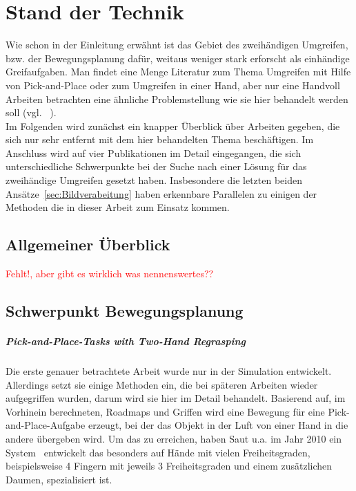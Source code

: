 \chapter{Stand der Technik}

Wie schon in der Einleitung erwähnt ist das Gebiet des zweihändigen Umgreifen, bzw. der Bewegungsplanung dafür, weitaus weniger stark erforscht als einhändige Greifaufgaben. Man findet eine Menge Literatur zum Thema Umgreifen mit Hilfe von \glqq Pick-and-Place\grqq{} oder zum Umgreifen in einer Hand, aber nur eine Handvoll Arbeiten betrachten eine ähnliche Problemstellung wie sie hier behandelt werden soll (vgl. ~\cite{Mousavi2013Taxonomy}).\\
Im Folgenden wird zunächst ein knapper Überblick über Arbeiten gegeben, die sich nur sehr entfernt mit dem hier behandelten Thema beschäftigen. Im Anschluss wird auf vier Publikationen im Detail eingegangen, die sich unterschiedliche Schwerpunkte bei der Suche nach einer Lösung für das zweihändige Umgreifen gesetzt haben. Insbesondere die letzten beiden Ansätze~\ref{sec:Bildverabeitung} haben erkennbare Parallelen zu einigen der Methoden die in dieser Arbeit zum Einsatz kommen.

\section{Allgemeiner Überblick}

\textcolor{red}{Fehlt!, aber gibt es wirklich was nennenswertes??}

\section{Schwerpunkt Bewegungsplanung}

\paragraph{Pick-and-Place-Tasks with Two-Hand Regrasping}

Die erste genauer betrachtete Arbeit wurde nur in der Simulation entwickelt. Allerdings setzt sie einige Methoden ein, die bei späteren Arbeiten wieder aufgegriffen wurden, darum wird sie hier im Detail behandelt. Basierend auf, im Vorhinein berechneten, Roadmaps und Griffen wird eine Bewegung für eine \glqq Pick-and-Place\grqq -Aufgabe erzeugt, bei der das Objekt in der Luft von einer Hand in die andere übergeben wird. Um das zu erreichen, haben Saut u.a. im Jahr 2010 ein System~\cite{saut2010planning} entwickelt das besonders auf Hände mit vielen Freiheitsgraden, beispielsweise 4 Fingern mit jeweils 3 Freiheitsgraden und einem zusätzlichen Daumen, spezialisiert ist.
\\

